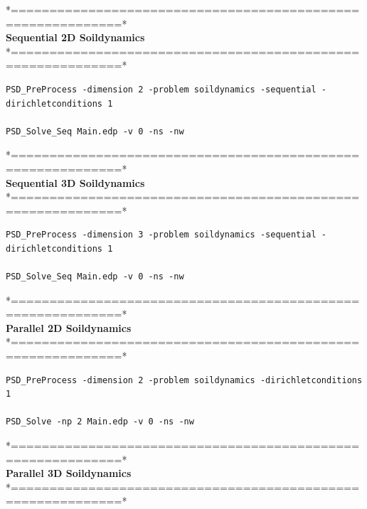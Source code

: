 *============================================================*\\
\textbf{ Sequential 2D Soildynamics }    \\                   
*============================================================*\\

\begin{lstlisting}[style=BashInputStyle]
PSD_PreProcess -dimension 2 -problem soildynamics -sequential -dirichletconditions 1  

PSD_Solve_Seq Main.edp -v 0 -ns -nw
\end{lstlisting}
*============================================================*\\
\textbf{ Sequential 3D Soildynamics  }  \\                    
*============================================================*\\

\begin{lstlisting}[style=BashInputStyle]
PSD_PreProcess -dimension 3 -problem soildynamics -sequential -dirichletconditions 1  

PSD_Solve_Seq Main.edp -v 0 -ns -nw
\end{lstlisting}
*============================================================*\\
\textbf{ Parallel 2D Soildynamics  }  \\                    
*============================================================*\\

\begin{lstlisting}[style=BashInputStyle]
PSD_PreProcess -dimension 2 -problem soildynamics -dirichletconditions 1  

PSD_Solve -np 2 Main.edp -v 0 -ns -nw
\end{lstlisting}
*============================================================*\\
\textbf{ Parallel 3D Soildynamics  }     \\                 
*============================================================*\\


